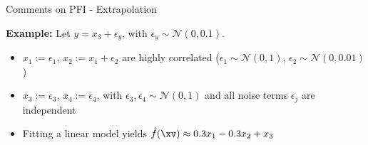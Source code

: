 \documentclass[11pt,compress,t,notes=noshow, aspectratio=169, xcolor=table]{beamer}
\begin{document}
\begin{frame}{Comments on PFI - Extrapolation}
 
 



\textbf{Example:} Let $y = x_3 + \epsilon_y$, with $\epsilon_y \sim \mathcal{N}(0, 0.1)$.

\begin{itemize}
  \item $x_1 := \epsilon_1$, $x_2 := x_1 + \epsilon_2$ are highly correlated  
        ($\epsilon_1 \sim \mathcal{N}(0,1)$, $\epsilon_2 \sim \mathcal{N}(0, 0.01)$)
  \item $x_3 := \epsilon_3$, $x_4 := \epsilon_4$, with $\epsilon_3, \epsilon_4 \sim \mathcal{N}(0,1)$ and all noise terms $\epsilon_j$ are independent
  \item Fitting a linear model yields $\hat{f}(\xv) \approx 0.3 x_1 - 0.3 x_2 + x_3$
\end{itemize}


\end{frame}
\end{document}
